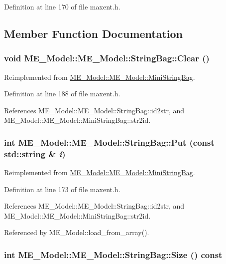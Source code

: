 Definition at line 170 of file maxent.h.

\subsection{Member Function Documentation}
\hypertarget{structME__Model_1_1StringBag_ce3d97f271ebaa31f4f09399b2c618db}{
\subsubsection[{Clear}]{\setlength{\rightskip}{0pt plus 5cm}void ME\_\-Model::ME\_\-Model::StringBag::Clear ()}}
\label{structME__Model_1_1StringBag_ce3d97f271ebaa31f4f09399b2c618db}




Reimplemented from \hyperlink{structME__Model_1_1MiniStringBag_8e33bf101509ddad253cd10a781474dd}{ME\_\-Model::ME\_\-Model::MiniStringBag}.

Definition at line 188 of file maxent.h.

References ME\_\-Model::ME\_\-Model::StringBag::id2str, and ME\_\-Model::ME\_\-Model::MiniStringBag::str2id.\hypertarget{structME__Model_1_1StringBag_d31d8c058e0795df0d25ee806088db1a}{
\subsubsection[{Put}]{\setlength{\rightskip}{0pt plus 5cm}int ME\_\-Model::ME\_\-Model::StringBag::Put (const std::string \& {\em i})}}
\label{structME__Model_1_1StringBag_d31d8c058e0795df0d25ee806088db1a}




Reimplemented from \hyperlink{structME__Model_1_1MiniStringBag_32f0102a227ee280ebda9e3555bb1fb1}{ME\_\-Model::ME\_\-Model::MiniStringBag}.

Definition at line 173 of file maxent.h.

References ME\_\-Model::ME\_\-Model::StringBag::id2str, and ME\_\-Model::ME\_\-Model::MiniStringBag::str2id.

Referenced by ME\_\-Model::load\_\-from\_\-array().\hypertarget{structME__Model_1_1StringBag_f1fc09c60ddd0274cc3f4b81377f626f}{
\subsubsection[{Size}]{\setlength{\rightskip}{0pt plus 5cm}int ME\_\-Model::ME\_\-Model::StringBag::Size () const}}
\label{structME__Model_1_1StringBag_f1fc09c60ddd0274cc3f4b81377f626f}




